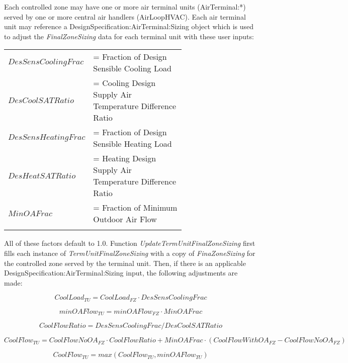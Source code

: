 Each controlled zone may have one or more air terminal units (AirTerminal:*) served by one or more central air handlers (AirLoopHVAC). Each air terminal unit may reference a DesignSpecification:AirTerminal:Sizing object which is used to adjust the \emph{FinalZoneSizing} data for each terminal unit with these user inputs:

\begin{tabular}{lp{0.7\linewidth}}
\\
		$DesSensCoolingFrac$ &= Fraction of Design Sensible Cooling Load\\
		$DesCoolSATRatio$ &= Cooling Design Supply Air Temperature Difference Ratio\\
		$DesSensHeatingFrac$ &= Fraction of Design Sensible Heating Load\\
		$DesHeatSATRatio$ &= Heating Design Supply Air Temperature Difference Ratio\\
	  $MinOAFrac$ &= Fraction of Minimum Outdoor Air Flow\\
\\
\end{tabular}

All of these factors default to 1.0. Function \emph{UpdateTermUnitFinalZoneSizing} first fills each instance of \emph{TermUnitFinalZoneSizing} with a copy of \emph{FinaZoneSizing} for the controlled zone served by the terminal unit. Then, if there is an applicable DesignSpecification:AirTerminal:Sizing input, the following adjustments are made:

\begin{equation}
    {CoolLoad_{TU}} = {CoolLoad_{FZ}} \cdot {DesSensCoolingFrac}
\end{equation}

\begin{equation}
    {minOAFlow_{TU}} = {minOAFlow_{FZ}} \cdot {MinOAFrac}
\end{equation}

\begin{equation}
    {CoolFlowRatio} = {DesSensCoolingFrac} / {DesCoolSATRatio}
\end{equation}

{\scriptsize
\begin{equation}
    {CoolFlow_{TU}} = {CoolFlowNoOA_{FZ}} \cdot CoolFlowRatio + {MinOAFrac} \cdot ( {CoolFlowWithOA_{FZ}} - {CoolFlowNoOA_{FZ}} ) 
\end{equation}}

\begin{equation}
    {CoolFlow_{TU}} = max({CoolFlow_{TU}},{minOAFlow_{TU}}) 
\end{equation}


